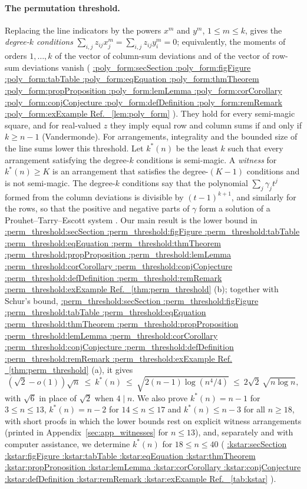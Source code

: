 \documentclass[11pt,a4paper]{article}
\makeatletter
\def\Cref@getprefix#1:#2\relax{#1}
\def\Cref@prefix@sec{sec}
\def\Cref@prefix@fig{fig}
\def\Cref@prefix@tab{tab}
\def\Cref@prefix@eq{eq}
\def\Cref@prefix@thm{thm}
\def\Cref@prefix@prop{prop}
\def\Cref@prefix@lem{lem}
\def\Cref@prefix@cor{cor}
\def\Cref@prefix@conj{conj}
\def\Cref@prefix@def{def}
\def\Cref@prefix@rem{rem}
\def\Cref@prefix@ex{ex}
\def\Cref@type@cap#1{%
  \edef\Cref@tmp{#1}%
  \ifx\Cref@tmp\Cref@prefix@sec Section%
  \else\ifx\Cref@tmp\Cref@prefix@fig Figure%
  \else\ifx\Cref@tmp\Cref@prefix@tab Table%
  \else\ifx\Cref@tmp\Cref@prefix@eq Equation%
  \else\ifx\Cref@tmp\Cref@prefix@thm Theorem%
  \else\ifx\Cref@tmp\Cref@prefix@prop Proposition%
  \else\ifx\Cref@tmp\Cref@prefix@lem Lemma%
  \else\ifx\Cref@tmp\Cref@prefix@cor Corollary%
  \else\ifx\Cref@tmp\Cref@prefix@conj Conjecture%
  \else\ifx\Cref@tmp\Cref@prefix@def Definition%
  \else\ifx\Cref@tmp\Cref@prefix@rem Remark%
  \else\ifx\Cref@tmp\Cref@prefix@ex Example%
  \else Ref.%
  \fi\fi\fi\fi\fi\fi\fi\fi\fi\fi\fi\fi
}
\DeclareRobustCommand{\Cref}[1]{%
  \begingroup
  \edef\Cref@label{#1}%
  \edef\Cref@prefix{\expandafter\Cref@getprefix\Cref@label:\relax}%
  \hyperref[#1]{\Cref@type@cap{\Cref@prefix}~\ref*{#1}}%
  \endgroup
}
\theoremstyle{plain}
\theoremstyle{definition}
\theoremstyle{remark}
\makeatother
\begin{document}
\paragraph{The permutation threshold.}
Replacing the line indicators by the powers $x^m$ and $y^m$, $1\le m\le k$, gives the \emph{degree-$k$ conditions} $\sum_{i,j}z_{ij}x_j^m=\sum_{i,j}z_{ij}y_i^m=0$; equivalently, the moments of orders $1,\dots,k$ of the vector of column-sum deviations and of the vector of row-sum deviations vanish (\Cref{lem:poly_form}).
They hold for every semi-magic square, and for real-valued $z$ they imply equal row and column sums if and only if $k\ge n-1$ (Vandermonde).
For arrangements, integrality and the bounded size of the line sums lower this threshold.
Let $k^*(n)$ be the least $k$ such that every arrangement satisfying the degree-$k$ conditions is semi-magic.
A \emph{witness} for $k^*(n)\ge K$ is an arrangement that satisfies the degree-$(K-1)$ conditions and is not semi-magic.
The degree-$k$ conditions say that the polynomial $\sum_j\gamma_jt^j$ formed from the column deviations is divisible by $(t-1)^{k+1}$, and similarly for the rows, so that the positive and negative parts of $\gamma$ form a solution of a Prouhet--Tarry--Escott system \cite{wright1959prouhet,borwein2002computational}.
Our main result is the lower bound in \Cref{thm:perm_threshold}(b); together with Schur's bound, \Cref{thm:perm_threshold}(a), it gives
\[
(\sqrt2-o(1))\sqrt n\ \le\ k^*(n)\ \le\ \sqrt{2(n-1)\log(n^4/4)}\ \le\ 2\sqrt2\,\sqrt{n\log n},
\]
with $\sqrt6$ in place of $\sqrt2$ when $4\mid n$.
We also prove $k^*(n)=n-1$ for $3\le n\le13$, $k^*(n)=n-2$ for $14\le n\le17$ and $k^*(n)\le n-3$ for all $n\ge18$, with short proofs in which the lower bounds rest on explicit witness arrangements (printed in Appendix~\ref{sec:app_witnesses} for $n\le13$), and, separately and with computer assistance, we determine $k^*(n)$ for $18\le n\le40$ (\Cref{tab:kstar}).
\end{document}

